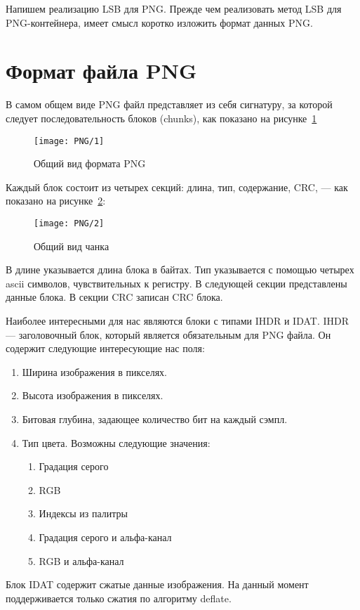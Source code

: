 Напишем реализацию LSB для PNG. Прежде чем реализовать метод LSB для PNG-контейнера,
имеет смысл коротко изложить формат данных PNG.

\section{Формат файла PNG}

В самом общем виде PNG файл представляет из себя сигнатуру,
за которой следует последовательность блоков (chunks),
как показано на рисунке~\ref{img:png_1}
\begin{figure}[ht!]
    \caption{Общий вид формата PNG}
    \texttt{[image: PNG/1]}
    \centering
    \label{img:png_1}
\end{figure}

Каждый блок состоит из четырех секций: длина, тип, содержание, CRC, --- как показано на рисунке~\ref{img:png_2}:
\begin{figure}[ht!]
    \caption{Общий вид чанка}
    \texttt{[image: PNG/2]}
    \centering
    \label{img:png_2}
\end{figure}
В длине указывается длина блока в байтах. Тип указывается с помощью четырех ascii символов,
чувствительных к регистру. В следующей секции представлены данные блока.
В секции CRC записан CRC блока.

Наиболее интересными для нас являются блоки с типами IHDR и IDAT.
IHDR --- заголовочный блок, который является обязательным для PNG файла.
Он содержит следующие интересующие нас поля:
\begin{enumerate}
    \item Ширина изображения в пикселях.
    \item Высота изображения в пикселях.
    \item Битовая глубина, задающее количество бит на каждый сэмпл.
    \item Тип цвета. Возможны следующие значения:
    \begin{enumerate}
        \item Градация серого
        \item RGB
        \item Индексы из палитры
        \item Градация серого и альфа-канал
        \item RGB и альфа-канал
    \end{enumerate}
\end{enumerate}

Блок IDAT содержит сжатые данные изображения.
На данный момент поддерживается только сжатия по алгоритму deflate.

